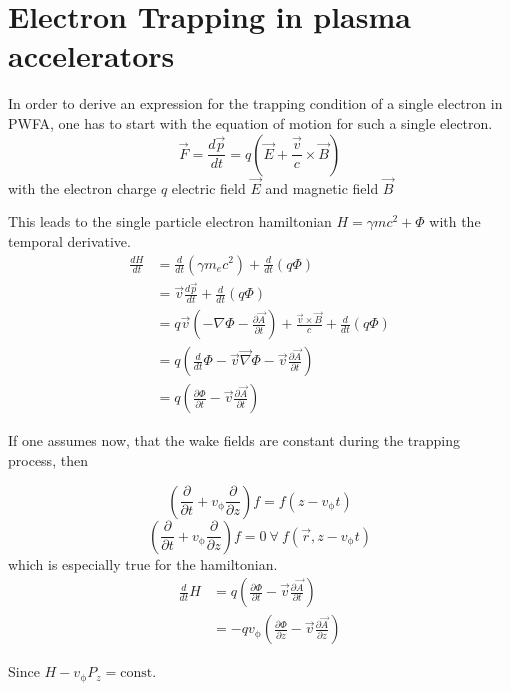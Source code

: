 \section{Electron Trapping in plasma accelerators}
\label{sec:Theory_Trapping}


In order to derive an expression for the trapping condition of a single electron in PWFA, one has to start with the equation of motion for such a single electron. 
\begin{equation}
\vec{F}=\frac{d\vec{p}}{dt}=q(\vec{E}+\frac{\vec{v}}{c}\times\vec{B})
\end{equation}
with the electron charge $q$ electric field $\vec{E}$ and magnetic field $\vec{B}$

This leads to the single particle electron hamiltonian $ H=\gamma m c^2+\Phi$ with the temporal derivative.
\begin{align}
\frac{dH}{dt}&=\frac{d}{dt} (\gamma m_e c^2)+\frac{d}{dt}(q\Phi)\\
&=\vec{v}\frac{d\vec{p}}{dt}+\frac{d}{dt}(q\Phi)\\
&=q\vec{v}(-\nabla \Phi-\frac{\partial \vec{A}}{\partial t})+\frac{\vec{v}\times\vec{B}}{c}+\frac{d}{dt}(q\Phi)\\
&=q(\frac{d}{dt}\Phi-\vec{v}\vec{\nabla}\Phi-\vec{v}\frac{\partial \vec{A}}{\partial t})\\
&=q(\frac{\partial \Phi}{\partial t}-\vec{v}\frac{\partial \vec{A}}{\partial t})
\end{align}

If one assumes now, that the wake fields are constant during the trapping process, then 

\begin{equation}
(\frac{\partial}{\partial t}+v_\mathrm{\phi} \frac{\partial}{\partial z} ) f =   f ( z-v_\mathrm{\phi} t)
\end{equation}\begin{equation}
(\frac{\partial}{\partial t}+v_\mathrm{\phi} \frac{\partial}{\partial z} ) f =0 \ \forall \   f (\vec{r}, z-v_\mathrm{\phi} t)
\end{equation}
which is especially true for the hamiltonian.
\begin{align*}
\frac{d}{dt}H&=q(\frac{\partial \Phi}{\partial t}-\vec{v}\frac{\partial \vec{A}}{\partial t})\\
&=-q v_\mathrm{\phi}(\frac{\partial \Phi}{\partial z}-\vec{v} \frac{\partial \vec{A}}{\partial z}) 
\end{align*}

Since $H-v_\mathrm{\phi}P_z=\mathrm{const.}$

